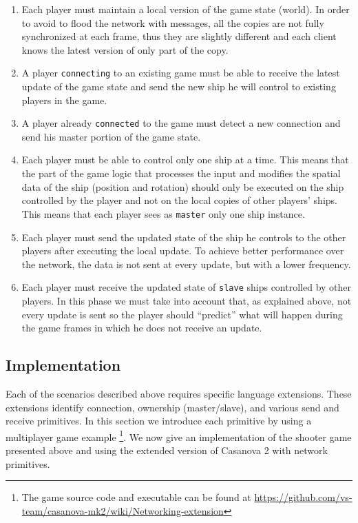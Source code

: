 \begin{enumerate}
	\item Each player must maintain a local version of the game state (world). In order to avoid to flood the network with messages, all the copies are not fully synchronized at each frame, thus they are slightly different and each client knows the latest version of only part of the copy.
	\item A player \texttt{connecting} to an existing game must be able to receive the latest update of the game state and send the new ship he will control to existing players in the game.
	\item A player already \texttt{connected} to the game must detect a new connection and send his master portion of the game state.
	\item Each player must be able to control only one ship at a time. This means that the part of the game logic that processes the input and modifies the spatial data of the ship (position and rotation) should only be executed on the ship controlled by the player and not on the local copies of other players' ships. This means that each player sees as \texttt{master} only one ship instance.
	\item Each player must send the updated state of the ship he controls to the other players after executing the local update. To achieve better performance over the network, the data is not sent at every update, but with a lower frequency.
	\item Each player must receive the updated state of \texttt{slave} ships controlled by other players. In this phase we must take into account that, as explained above, not every update is sent so the player should ``predict'' what will happen during the game frames in which he does not receive an update.
\end{enumerate}

\subsection{Implementation}
Each of the scenarios described above requires specific language extensions. These extensions identify connection, ownership (master/slave), and various send and receive primitives. In this section we introduce each primitive by using a multiplayer game example \footnote{The game source code and executable can be found at \url{https://github.com/vs-team/casanova-mk2/wiki/Networking-extension}}. We now give an implementation of the shooter game presented above and using the extended version of Casanova 2 with network primitives. 

